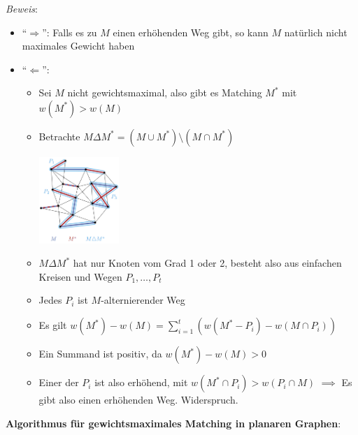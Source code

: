 \textit{Beweis}: 
\begin{itemize}
	\item \enquote{$\Rightarrow$}: Falls es zu $M$ einen erhöhenden Weg gibt, so kann $M$ natürlich nicht maximales Gewicht haben
	\item \enquote{$\Leftarrow$}: 
	\begin{itemize}
		\item Sei $M$ nicht gewichtsmaximal, also gibt es Matching $M^*$ mit $w(M^*)>w(M)$
		\item Betrachte $M\Delta M^*=(M\cup M^*)\setminus(M\cap M^*)$
		\begin{center}
			\includegraphics[width=0.25\textwidth]{images/moag1.png}
		\end{center}
		\item $M\Delta M^*$ hat nur Knoten vom Grad 1 oder 2, besteht also aus einfachen Kreisen und Wegen $P_1,\ldots, P_t$
		\item Jedes $P_i$ ist $M$-alternierender Weg
		\item Es gilt $w(M^*)-w(M)=\sum\limits_{i=1}^t (w(M^*-P_i)-w(M\cap P_i))$
		\item Ein Summand ist positiv, da $w(M^*)-w(M)>0$
		\item Einer der $P_i$ ist also erhöhend, mit $w(M^*\cap P_i)>w(P_i\cap M)$ $\implies$ Es gibt also einen erhöhenden Weg. Widerspruch.
	\end{itemize}
\end{itemize}
\bigskip
\textbf{Algorithmus für gewichtsmaximales Matching in planaren Graphen}: 
